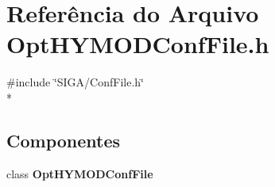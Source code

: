 \section{Referência do Arquivo Opt\+H\+Y\+M\+O\+D\+Conf\+File.\+h}
\label{_opt_h_y_m_o_d_conf_file_8h}
{\ttfamily \#include \char`\"{}S\+I\+G\+A/\+Conf\+File.\+h\char`\"{}}\\*
\subsection*{Componentes}
\begin{DoxyCompactItemize}
\item 
class {\bf Opt\+H\+Y\+M\+O\+D\+Conf\+File}
\end{DoxyCompactItemize}
